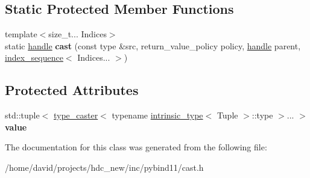 \subsection*{Static Protected Member Functions}
\begin{DoxyCompactItemize}
\item 
{\footnotesize template$<$size\+\_\+t... Indices$>$ }\\static \hyperlink{classhandle}{handle} {\bfseries cast} (const type \&src, return\+\_\+value\+\_\+policy policy, \hyperlink{classhandle}{handle} parent, \hyperlink{structindex__sequence}{index\+\_\+sequence}$<$ Indices... $>$)\hypertarget{classtype__caster_3_01std_1_1tuple_3_01_tuple_8_8_8_01_4_01_4_a1911fa4e5f8e9af5efecb3e2ae1dd5e0}{}\label{classtype__caster_3_01std_1_1tuple_3_01_tuple_8_8_8_01_4_01_4_a1911fa4e5f8e9af5efecb3e2ae1dd5e0}

\end{DoxyCompactItemize}
\subsection*{Protected Attributes}
\begin{DoxyCompactItemize}
\item 
std\+::tuple$<$ \hyperlink{classtype__caster}{type\+\_\+caster}$<$ typename \hyperlink{structintrinsic__type}{intrinsic\+\_\+type}$<$ Tuple $>$\+::type $>$... $>$ {\bfseries value}\hypertarget{classtype__caster_3_01std_1_1tuple_3_01_tuple_8_8_8_01_4_01_4_a82072bd951305837c1981d76803014e3}{}\label{classtype__caster_3_01std_1_1tuple_3_01_tuple_8_8_8_01_4_01_4_a82072bd951305837c1981d76803014e3}

\end{DoxyCompactItemize}


The documentation for this class was generated from the following file\+:\begin{DoxyCompactItemize}
\item 
/home/david/projects/hdc\+\_\+new/inc/pybind11/cast.\+h\end{DoxyCompactItemize}

